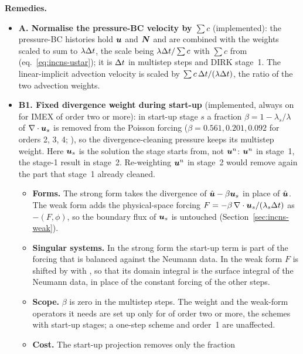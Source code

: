 \textbf{Remedies.}
\begin{itemize}
  \item \textbf{A. Normalise the pressure-BC velocity by $\sum c$}
  (implemented): the pressure-BC histories hold $\boldsymbol{u}$ and $\boldsymbol{N}$
  and are combined with the weights scaled to sum to $\lambda\Delta t$, the
  scale being $\lambda\Delta t/\sum c$ with $\sum c$ from
  (eq.~\eqref{eq:incns-ustar}); it is $\Delta t$ in multistep steps and DIRK
  stage~1. The linear-implicit advection velocity is scaled by
  $\sum c\,\Delta t/(\lambda\Delta t)$, the ratio of the two advection
  weights.
  \item \textbf{B1. Fixed divergence weight during start-up} (implemented,
  always on for IMEX of order two or more): in start-up stage $s$ a fraction
  $\beta=1-\lambda_s/\lambda$ of $\nabla\cdot\boldsymbol{u}_s$ is removed from
  the Poisson forcing ($\beta=0.561,0.201,0.092$ for orders 2, 3, 4;
  ), so the divergence-cleaning pressure
  keeps its multistep weight. Here $\boldsymbol{u}_s$ is the solution the stage
  starts from, not $\boldsymbol{u}^n$: $\boldsymbol{u}^n$ in stage~1, the stage-1
  result in stage~2. Re-weighting $\boldsymbol{u}^n$ in stage~2 would remove again
  the part that stage~1 already cleaned.
  \begin{itemize}
    \item \textbf{Forms.} The strong form takes the divergence of
    $\hat{\boldsymbol{u}}-\beta\boldsymbol{u}_s$ in place of $\hat{\boldsymbol{u}}$. The
    weak form adds the physical-space forcing
    $F=-\beta\,\nabla\cdot\boldsymbol{u}_s/(\lambda_s\Delta t)$ as $-(F,\phi)$,
    so
    the boundary flux of $\boldsymbol{u}_s$ is untouched
    (Section~\ref{sec:incns-weak}).
    \item \textbf{Singular systems.} In the strong form the start-up term is
    part of the forcing that is balanced against the Neumann data. In the
    weak form $F$ is shifted by  with
    , so that its domain integral is the surface
    integral of the Neumann data, in place of the constant forcing of the
    other steps.
    \item \textbf{Scope.} $\beta$ is zero in the multistep steps. The weight
    and the weak-form operators it needs are set up only for  of
    order two or more, the schemes with start-up stages; a one-step scheme
    and  order~1 are unaffected.
    \item \textbf{Cost.} The start-up projection removes only the fraction

\end{itemize}
\end{itemize}
